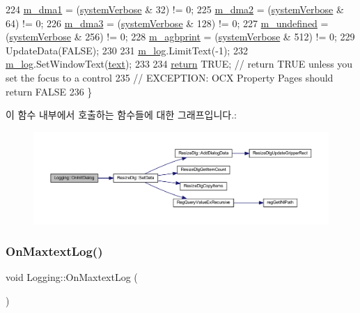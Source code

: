 \begin{DoxyCode}
224   \mbox{\hyperlink{class_logging_a7c8a00ceb6cc33b59daff89a3b509ab6}{m\_dma1}} = (\mbox{\hyperlink{system_8cpp_a67739df6b2271a8b807f01c50a610478}{systemVerbose}} & 32) != 0;
225   \mbox{\hyperlink{class_logging_a55074d40fb891df86bda48f59568b1e6}{m\_dma2}} = (\mbox{\hyperlink{system_8cpp_a67739df6b2271a8b807f01c50a610478}{systemVerbose}} & 64) != 0;
226   \mbox{\hyperlink{class_logging_aa540b301bc08f1302beb83ff574d89c4}{m\_dma3}} = (\mbox{\hyperlink{system_8cpp_a67739df6b2271a8b807f01c50a610478}{systemVerbose}} & 128) != 0;
227   \mbox{\hyperlink{class_logging_a622f9b082c10c8195c5faa7a8577d520}{m\_undefined}} = (\mbox{\hyperlink{system_8cpp_a67739df6b2271a8b807f01c50a610478}{systemVerbose}} & 256) != 0;
228   \mbox{\hyperlink{class_logging_a1d79a280aa882918585c08f3e0c2b747}{m\_agbprint}} = (\mbox{\hyperlink{system_8cpp_a67739df6b2271a8b807f01c50a610478}{systemVerbose}} & 512) != 0;
229   UpdateData(FALSE);
230 
231   \mbox{\hyperlink{class_logging_ab1fbdc0eaf2afc3f7f493a3c9605511c}{m\_log}}.LimitText(-1);
232   \mbox{\hyperlink{class_logging_ab1fbdc0eaf2afc3f7f493a3c9605511c}{m\_log}}.SetWindowText(\mbox{\hyperlink{class_logging_a4a9482d0ffecc6b04232867690fd7b21}{text}});
233   
234   \mbox{\hyperlink{gb_codes_8h_a9717e7bbecb906637e86cef6da3d83c2}{return}} TRUE;  \textcolor{comment}{// return TRUE unless you set the focus to a control}
235                 \textcolor{comment}{// EXCEPTION: OCX Property Pages should return FALSE}
236 \}
\end{DoxyCode}
이 함수 내부에서 호출하는 함수들에 대한 그래프입니다.\+:
\nopagebreak
\begin{figure}[H]
\begin{center}
\leavevmode
\includegraphics[width=350pt]{class_logging_a5a0a6200a3d55702597a73f7fe8794f5_cgraph}
\end{center}
\end{figure}
\mbox{\label{class_logging_a4d292fcd815e0ea21894c4ff08b4a4f8}} 
\subsubsection{\texorpdfstring{On\+Maxtext\+Log()}{OnMaxtextLog()}}
{\footnotesize\ttfamily void Logging\+::\+On\+Maxtext\+Log (\begin{DoxyParamCaption}{ }\end{DoxyParamCaption})\hspace{0.3cm}{\ttfamily [protected]}}




